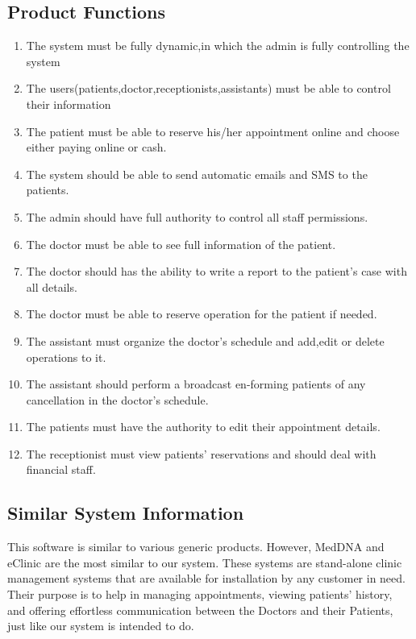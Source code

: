 \documentclass[]{article}
\begin{document}
\subsection{Product Functions}
\begin{enumerate}
  \item The system must be fully dynamic,in which the admin is fully controlling the system
  \item The users(patients,doctor,receptionists,assistants) must be able to control their information 
  \item The patient must be able to reserve his/her appointment online and choose either paying online or cash.
  \item The system should be able to send automatic emails and SMS to the patients.
  \item The admin should have full authority to control all staff permissions.
  \item The doctor must be able to see full information of the patient.
  \item The doctor should has the ability to write a report to the patient's case with all details.
  \item The doctor must be able to reserve operation for the patient if needed.
  \item The assistant must organize the doctor's schedule and add,edit or delete operations to it.
  \item The assistant should perform a broadcast en-forming patients of any cancellation in the doctor's schedule.
  \item The patients must have the authority to edit their appointment details.
  \item The receptionist must view patients' reservations and should deal with financial staff.
\end{enumerate}

\subsection{Similar System Information}
This software is similar to various generic products. However, MedDNA and eClinic are the most similar to our system. These systems are stand-alone clinic management systems that are available for installation by any customer in need. Their purpose is to help in managing appointments, viewing patients' history, and offering effortless communication between the Doctors and their Patients, just like our system is intended to do.
\end{document}
